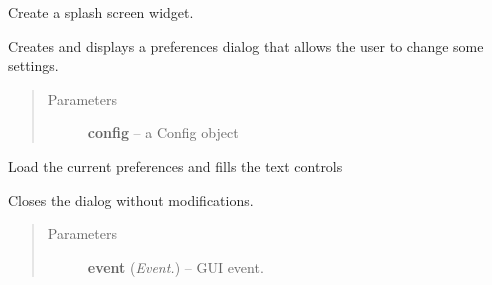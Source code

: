 \documentclass[letterpaper,10pt,english]{sphinxmanual}
\begin{document}

\begin{fulllineitems}
\label{api:wos.MySplashScreen}
Create a splash screen widget.

\end{fulllineitems}


\begin{fulllineitems}
\label{api:wos.PreferencesDialog}
Creates and displays a preferences dialog that allows the user to
change some settings.
\begin{quote}\begin{description}
\item[{Parameters}] \leavevmode
\textbf{config} -- a Config object

\end{description}\end{quote}

\begin{fulllineitems}
\label{api:wos.PreferencesDialog.loadPreferences}
Load the current preferences and fills the text controls

\end{fulllineitems}


\begin{fulllineitems}
\label{api:wos.PreferencesDialog.onCancel}
Closes the dialog without modifications.
\begin{quote}\begin{description}
\item[{Parameters}] \leavevmode
\textbf{event} (\emph{Event.}) -- GUI event.

\end{description}\end{quote}

\end{fulllineitems}



\end{fulllineitems}
\end{document}
